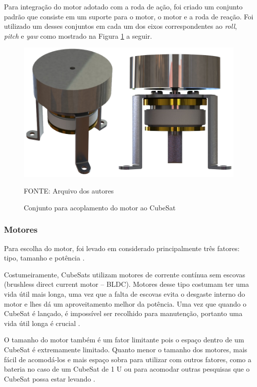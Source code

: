 \documentclass[
	12pt,				%
	openany,			%
	twoside,			%
	a4paper,			%
	english,			%
	french,				%
	spanish,			%
	brazil,				%
	oldfontcommands
	]{abntex2}
\begin{document}
Para integração do motor adotado com a roda de ação, foi criado um conjunto padrão que consiste em um suporte para o motor, o motor e a roda de reação. Foi utilizado um desses conjuntos em cada um dos eixos correspondentes ao \textit{roll}, \textit{pitch} e \textit{yaw} como mostrado na Figura \ref{fig:MotSet} a seguir.

\begin{figure}[th]
	\caption{Conjunto para acoplamento do motor ao CubeSat}
	\centering
	\includegraphics[width=0.69\linewidth]{./figs/Motor_Set}
	
	\begin{small}
		FONTE: Arquivo dos autores
	\end{small}
	\label{fig:MotSet}
\end{figure}

\subsubsection{Motores}

Para escolha do motor, foi levado em considerado principalmente três fatores: tipo, tamanho e potência \cite{Ericksson}.

Costumeiramente, CubeSats utilizam motores de corrente contínua sem escovas (brushless direct current motor – BLDC). Motores desse tipo costumam ter uma vida útil mais longa, uma vez que a falta de escovas evita o desgaste interno do motor e lhes dá um aproveitamento melhor da potência. Uma vez que quando o CubeSat é lançado, é impossível ser recolhido para manutenção, portanto uma vida útil longa é crucial \cite{Martins}.

O tamanho do motor também é um fator limitante pois o espaço dentro de um CubeSat é extremamente limitado. Quanto menor o tamanho dos motores, mais fácil de acomodá-los e mais espaço sobra para utilizar com outros fatores, como a bateria no caso de um CubeSat de 1 U ou para acomodar outras pesquisas que o CubeSat possa estar levando \cite{Martins}.
\end{document}
